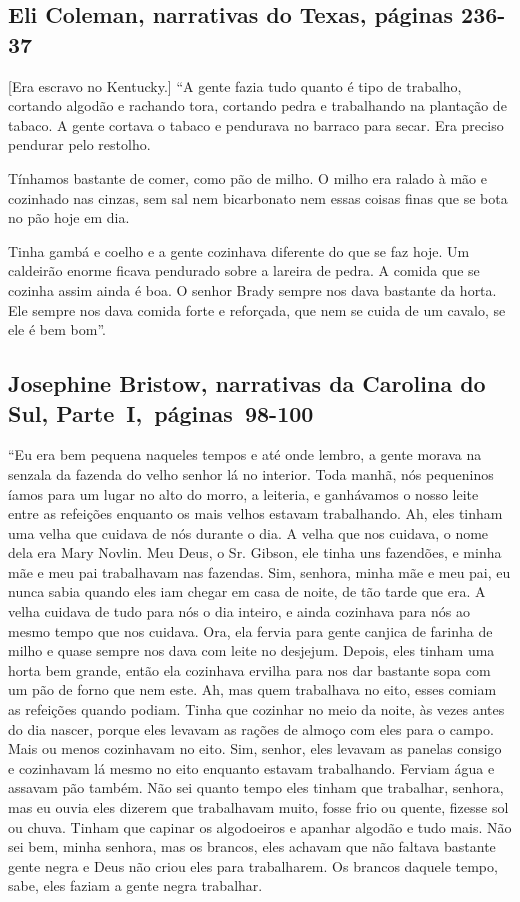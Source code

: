 \subsection{Eli Coleman, narrativas do Texas, páginas 236-37}

{[}Era escravo no Kentucky.{]} ``A gente fazia tudo quanto é tipo de trabalho, cortando algodão e
rachando tora, cortando pedra e trabalhando na plantação de tabaco. A
gente cortava o tabaco e pendurava no barraco para secar. Era preciso
pendurar pelo restolho.

Tínhamos bastante de comer, como pão de milho. O milho era ralado à mão
e cozinhado nas cinzas, sem sal nem bicarbonato nem essas coisas finas
que se bota no pão hoje em dia.

Tinha gambá e coelho e a gente cozinhava diferente do que se faz hoje.
Um caldeirão enorme ficava pendurado sobre a lareira de pedra. A comida
que se cozinha assim ainda é boa. O senhor Brady sempre nos dava
bastante da horta. Ele sempre nos dava comida forte e reforçada, que nem
se cuida de um cavalo, se ele é bem bom''.

\subsection{Josephine Bristow, narrativas da Carolina do Sul, Parte~I,~páginas~98-100} \label{ref34}

``Eu era bem pequena naqueles tempos e até onde lembro, a gente morava
na senzala da fazenda do velho senhor lá no interior. Toda manhã, nós
pequeninos íamos para um lugar no alto do morro, a leiteria, e
ganhávamos o nosso leite entre as refeições enquanto os mais velhos
estavam trabalhando. Ah, eles tinham uma velha que cuidava de nós
durante o dia. A velha que nos cuidava, o nome dela era Mary Novlin. Meu
Deus, o Sr. Gibson, ele tinha uns fazendões, e minha mãe e meu pai
trabalhavam nas fazendas. Sim, senhora, minha mãe e meu pai, eu nunca
sabia quando eles iam chegar em casa de noite, de tão tarde que era. A
velha cuidava de tudo para nós o dia inteiro, e ainda cozinhava para nós
ao mesmo tempo que nos cuidava. Ora, ela fervia para gente canjica de
farinha de milho e quase sempre nos dava com leite no desjejum. Depois,
eles tinham uma horta bem grande, então ela cozinhava ervilha para nos
dar bastante sopa com um pão de forno que nem este. Ah, mas quem
trabalhava no eito, esses comiam as refeições quando podiam. Tinha que
cozinhar no meio da noite, às vezes antes do dia nascer, porque eles
levavam as rações de almoço com eles para o campo. Mais ou menos
cozinhavam no eito. Sim, senhor, eles levavam as panelas consigo e
cozinhavam lá mesmo no eito enquanto estavam trabalhando. Ferviam água e
assavam pão também. Não sei quanto tempo eles tinham que trabalhar,
senhora, mas eu ouvia eles dizerem que trabalhavam muito, fosse frio ou
quente, fizesse sol ou chuva. Tinham que capinar os algodoeiros e
apanhar algodão e tudo mais. Não sei bem, minha senhora, mas os brancos,
eles achavam que não faltava bastante gente negra e Deus não criou eles
para trabalharem. Os brancos daquele tempo, sabe, eles faziam a gente
negra trabalhar.

